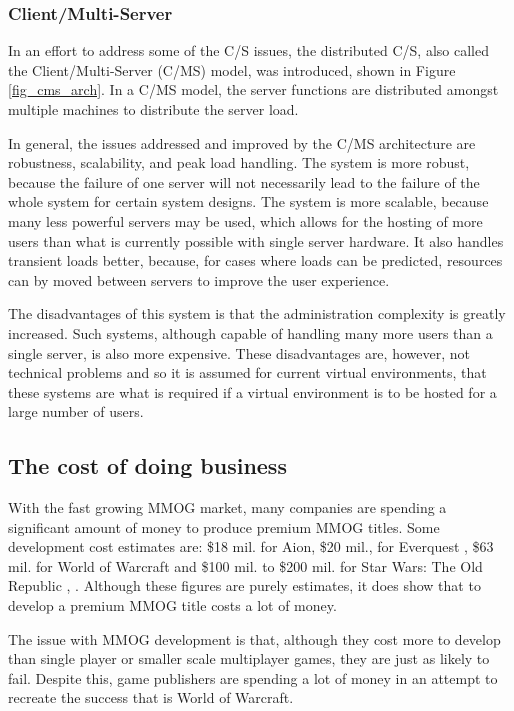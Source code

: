 \subsubsection{Client/Multi-Server}

In an effort to address some of the C/S issues, the distributed C/S, also called the Client/Multi-Server (C/MS) model, was introduced, shown in Figure \ref{fig_cms_arch}. In a C/MS model,
the server functions are distributed amongst multiple machines to distribute the server load.

In general, the issues addressed and improved by the C/MS architecture are robustness, scalability, and peak load handling. The system is more robust, because the failure of one server will not necessarily lead to the failure of the whole system for certain system designs. The system is more scalable, because many less powerful servers may be used, which allows for the hosting of more users than what is currently possible with single server hardware. It also handles transient loads better, because, for cases where loads can be predicted, resources can by moved between servers to improve the user experience.

The disadvantages of this system is that the administration complexity is greatly increased. Such systems, although capable of handling many more users than a single server, is also more expensive. These disadvantages are, however, not technical problems and so it is assumed for current virtual environments, that these systems are what is required if a virtual environment is to be hosted for a large number of users.

\subsection{The cost of doing business}
\label{mmog_cost}

With the fast growing MMOG market, many companies are spending a significant amount of money to produce premium MMOG titles. Some development cost estimates are: \$18 mil. for Aion, \$20 mil., for Everquest \cite{aion_everquest_cost}, \$63 mil. for World of Warcraft \cite{wow_cost} and \$100 mil. to \$200 mil. for Star Wars: The Old Republic \cite{star_wars_cost_1}, \cite{star_wars_cost_2}. Although these figures are purely estimates, it does show that to develop a premium MMOG title costs a lot of money.

The issue with MMOG development is that, although they cost more to develop than single player or smaller scale multiplayer games, they are just as likely to fail. Despite this, game publishers are spending a lot of money in an attempt to recreate the success that is World of Warcraft.

